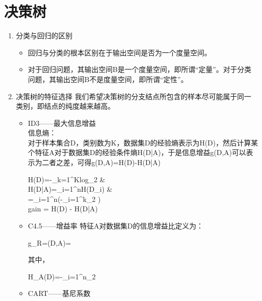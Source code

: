 \chapter{决策树}
\setlength{\parskip}{6pt}
\begin{enumerate}
	\item 分类与回归的区别
	\begin{itemize}
		\item 回归与分类的根本区别在于输出空间是否为一个度量空间。
		\item 对于回归问题，其输出空间B是一个度量空间，即所谓“定量”。对于分类问题，其输出空间B不是度量空间，即所谓“定性”。
	\end{itemize}
	\item 决策树的特征选择
	我们希望决策树的分支结点所包含的样本尽可能属于同一类别，即结点的纯度越来越高。
	\begin{itemize}
		\item ID3——最大信息增益\\
		信息熵：\\
		对于样本集合D，类别数为K，数据集D的经验熵表示为H(D)，然后计算某个特征A对于数据集D的经验条件熵H(D|A)，于是信息增益g(D,A)可以表示为二者之差，可得g(D,A)=H(D)-H(D|A)
		\begin{flalign}
		H(D)=-\sum_{k=1}^{K}log_{2}  &\\
		H(D|A)=\sum_{i=1}^{n}H(D_i) &\\
		=\sum_{i=1}^{n}(-\sum_{i=1}^{k}\log_2 )  \\gain = H(D) - H(D|A)
		\end{flalign}
		\item C4.5——增益率
		特征A对数据集D的信息增益比定义为：\\
		\begin{flalign}
			g_R=(D,A)=\frac{g(D,A)}{H_A(D)}
		\end{flalign}
		其中，
		\begin{flalign}
		H_{A}(D)=-\sum_{i=1}^{n}\log_2\frac{|D_i|}{|D|}
		\end{flalign}
		\item CART——基尼系数

\end{itemize}
\end{enumerate}
